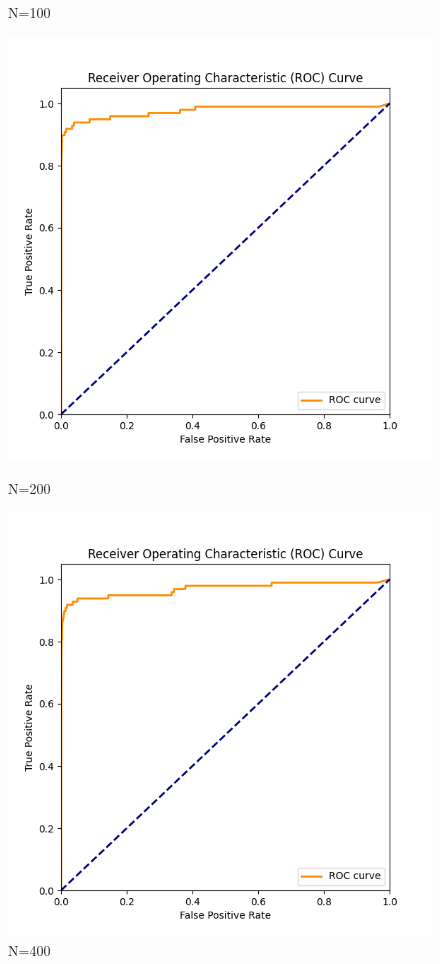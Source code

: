 \documentclass[8pt]{article}
\begin{document}
\begin{figure}[H]
\begin{minipage}{0.31\textwidth}
        \caption{N=100}
        \label{fig:roc_curve_N_100_K_7}
    \end{minipage}
    \begin{minipage}{0.31\textwidth}
        \centering
        \includegraphics[width=\textwidth]{../Prob1/out/rand_seed_14/task3/roc_curve_N_200_K_7.png}
        \caption{N=200}
        \label{fig:roc_curve_N_200_K_7}
    \end{minipage}
    \begin{minipage}{0.31\textwidth}
        \centering
        \includegraphics[width=\textwidth]{../Prob1/out/rand_seed_14/task3/roc_curve_N_400_K_7.png}
        \caption{N=400}
        \label{roc_curve_N_400_K_7}
    \end{minipage}
\end{figure}
\end{document}
